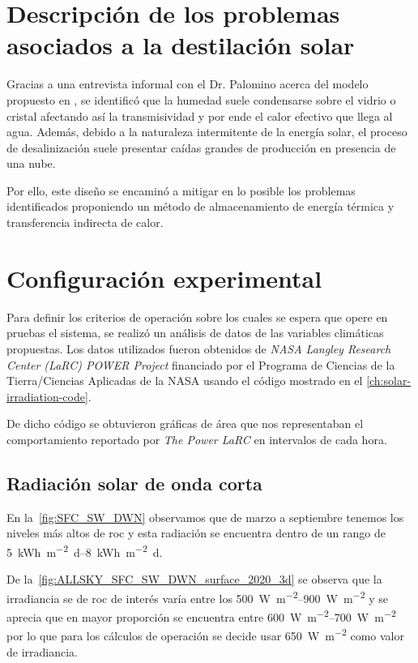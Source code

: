 	\section{Descripción de los problemas asociados a la destilación solar}
		
		Gracias a una entrevista informal con el Dr. Palomino acerca del modelo propuesto en \cite{palomino-resendiz_design_2018}, se identificó que la humedad suele condensarse sobre el vidrio o cristal afectando así la transmisividad y por ende el calor efectivo que llega al agua. Además, debido a la naturaleza intermitente de la energía solar, el proceso de desalinización suele presentar caídas grandes de producción en presencia de una nube.
		
		Por ello, este diseño se encaminó a mitigar en lo posible los problemas identificados proponiendo un método de almacenamiento de energía térmica y transferencia indirecta de calor.
		
	\section{Configuración experimental}
		
		Para definir los criterios de operación sobre los cuales se espera que opere en pruebas el sistema, se realizó un análisis de datos de las variables climáticas propuestas. Los datos utilizados fueron obtenidos de \textit{NASA Langley Research Center (LaRC) POWER Project} financiado por el Programa de Ciencias de la Tierra/Ciencias Aplicadas de la NASA usando el código mostrado en el \cref{ch:solar-irradiation-code}.
		
		De dicho código se obtuvieron gráficas de área que nos representaban el comportamiento reportado por \textit{The Power LaRC} en intervalos de cada hora.
	
		\subsection{Radiación solar de onda corta}
			
			En la~\cref{fig:SFC_SW_DWN} observamos que de marzo a septiembre tenemos los niveles más altos de \acrlong{roc} y esta radiación se encuentra dentro de un rango de \qtyrange{5}{8}{\kWh\per\m\tothe{2}\day}.
			
			De la~\cref{fig:ALLSKY_SFC_SW_DWN_surface_2020_3d} se observa que la irradiancia se de \acrshort{roc} de interés varía entre los \qtyrange{500}{900}{\watt\per\m\tothe{2}} y se aprecia que en mayor proporción se encuentra entre \qtyrange{600}{700}{\watt\per\m\tothe{2}} por lo que para los cálculos de operación se decide usar \qty{650}{\watt\per\m\tothe{2}} como valor de irradiancia.
	
